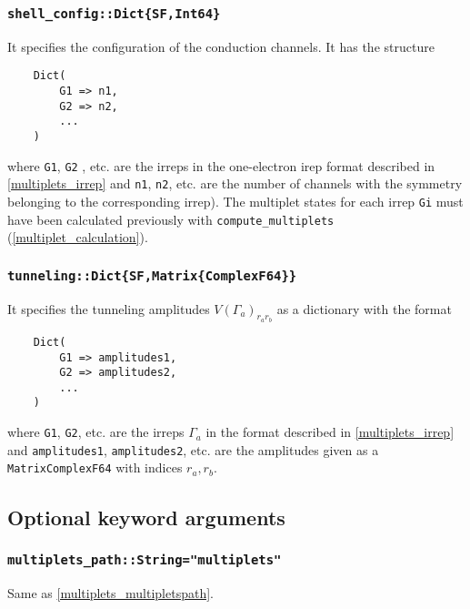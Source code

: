 \documentclass[notitlepage]{article}
\begin{document}
\subsubsection{\texttt{shell\_config::Dict\{SF,Int64\}}}
\label{nrg_shellconfig}
It specifies the configuration of the conduction channels.
It has the structure
\begin{verbatim}
    Dict( 
        G1 => n1,
        G2 => n2,
        ...
    )
\end{verbatim}
where \texttt{G1}, \texttt{G2} , etc. are the irreps in the
one-electron irep format described in \ref{multiplets_irrep}
and \texttt{n1}, \texttt{n2}, etc. are the number of
channels with the symmetry belonging to the corresponding
irrep). The multiplet states for each irrep \texttt{Gi} must
have been calculated previously with
\texttt{compute\_multiplets} (\ref{multiplet_calculation}).

\subsubsection{\texttt{tunneling::Dict\{SF,Matrix\{ComplexF64\}\}}}
\label{nrg_tunnneling}
It specifies the tunneling amplitudes $V(\Gamma_a)_{r_a
r_b}$ as a dictionary with the format
\begin{verbatim}
    Dict(
        G1 => amplitudes1,
        G2 => amplitudes2,
        ...
    )
\end{verbatim}
where \texttt{G1}, \texttt{G2}, etc. are the irreps
$\Gamma_a$ in the format described in \ref{multiplets_irrep}
and \texttt{amplitudes1}, \texttt{amplitudes2}, etc. are the
amplitudes given as a \texttt{Matrix{ComplexF64}} with
indices $r_a,r_b$.

\subsection{Optional keyword arguments}

\subsubsection{\texttt{multiplets\_path::String="multiplets"}}
\label{nrg_multipletspath}
Same as \ref{multiplets_multipletspath}.
\end{document}
